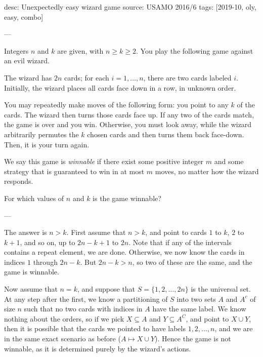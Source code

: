 desc: Unexpectedly easy wizard game
source: USAMO 2016/6
tags: [2019-10, oly, easy, combo]

---

Integers $n$ and $k$ are given, with $n\ge k\ge2$. You play the following game against an evil wizard.

The wizard has $2n$ cards; for each $i=1,\ldots,n$, there are two cards labeled $i$. Initially, the wizard places all cards face down in a row, in unknown order.

You may repeatedly make moves of the following form: you point to any $k$ of the cards. The wizard then turns those cards face up. If any two of the cards match, the game is over and you win. Otherwise, you must look away, while the wizard arbitrarily permutes the $k$ chosen cards and then turns them back face-down. Then, it is your turn again.

We say this game is \emph{winnable} if there exist some positive integer $m$ and some strategy that is guaranteed to win in at most $m$ moves, no matter how the wizard responds.

For which values of $n$ and $k$ is the game winnable?

---

The answer is $n>k$. First assume that $n>k$, and point to cards $1$ to $k$, $2$ to $k+1$, and so on, up to $2n-k+1$ to $2n$. Note that if any of the intervals contains a repeat element, we are done. Otherwise, we now know the cards in indices $1$ through $2n-k$. But $2n-k>n$, so two of these are the same, and the game is winnable.

Now assume that $n=k$, and suppose that $S=\{1,2,\ldots,2n\}$ is the universal set. At any step after the first, we know a partitioning of $S$ into two sets $A$ and $A^c$ of size $n$ such that no two cards with indices in $A$ have the same label. We know nothing about the orders, so if we pick $X\subseteq A$ and $Y\subseteq A^C$, and point to $X\cup Y$, then it is possible that the cards we pointed to have labels $1,2,\ldots,n$, and we are in the same exact scenario as before ($A\mapsto X\cup Y$). Hence the game is not winnable, as it is determined purely by the wizard's actions.
